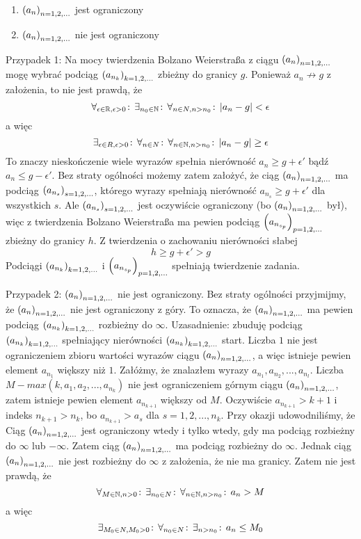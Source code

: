 \documentclass[9pt]{article}
\begin{document}
\begin{enumerate}
    \item $\left(a_n\right)_{n = 1,2,...}$ jest ograniczony
    \item $\left(a_n\right)_{n = 1,2,...}$ nie jest ograniczony
\end{enumerate}

Przypadek 1: Na mocy twierdzenia Bolzano Weierstraßa z ciągu $\left(a_n\right)_{n = 1,2,...}$ mogę wybrać podciąg
$\left(a_{n_k}\right)_{k = 1,2,...}$ zbieżny do granicy $g$. Ponieważ $a_n \not\to g$ z założenia, to nie jest
prawdą, że
\[
    \forall_{\epsilon \in \mathbb{R}, \epsilon > 0} \! : \, \exists_{n_0 \in \mathbb{N}} \! : \, \forall_{n \in N, n > n_0} \! : \, |a_n - g| < \epsilon
\]
a więc
\[
    \exists_{\epsilon \in R, \epsilon > 0} \! : \, \forall_{n \in N} \! : \, \forall_{n \in \mathbb{N}, n > n_0} \! : \, |a_n-g| \ge \epsilon
\]
To znaczy nieskończenie wiele wyrazów spełnia nierówność $a_n \ge g + \epsilon'$ bądź $a_n \le g -
\epsilon'$. Bez straty ogólności możemy zatem założyć, że ciąg $\left(a_n\right)_{n = 1,2,...}$ ma podciąg
$\left(a_{n_s}\right)_{s = 1,2,...}$, którego wyrazy spełniają nierówność $a_{n_s} \ge g + \epsilon'$ dla wszystkich
$s$. Ale $\left(a_{n_s}\right)_{s = 1,2,...}$ jest oczywiście ograniczony (bo $\left(a_n\right)_{n = 1,2,...}$ był), więc z twierdzenia
Bolzano Weierstraßa ma pewien podciąg $\left(a_{n_{s_p}}\right)_{p = 1,2,...}$ zbieżny do granicy $h$. Z twierdzenia
o zachowaniu nierówności słabej
\[
    h \ge g + \epsilon' > g
\]
Podciągi $\left(a_{n_k}\right)_{k = 1,2,...}$ i $\left(a_{n_{s_p}}\right)_{p = 1,2,...}$ spełniają twierdzenie zadania.

Przypadek 2: $\left(a_n\right)_{n = 1,2,...}$ nie jest ograniczony. Bez straty ogólności przyjmijmy, że $\left(a_n\right)_{n = 1,2,...}$ nie
jest ograniczony z góry. To oznacza, że $\left(a_n\right)_{n = 1,2,...}$ ma pewien podciąg $\left(a_{n_k}\right)_{k = 1,2,...}$ rozbieżny
do $\infty$. Uzasadnienie: zbuduję podciąg $\left(a_{n_k}\right)_{k = 1,2,...}$ spełniający nierówności
$\left(a_{n_k}\right)_{k = 1,2,...}$ start. Liczba $1$ nie jest ograniczeniem zbioru wartości wyrazów ciągu
$\left(a_n\right)_{n = 1,2,...}$, a więc istnieje pewien element $a_{n_1}$ większy niż $1$. Załóżmy, że znalazłem wyrazy
$a_{n_1}, a_{n_2}, ..., a_{n_l}$. Liczba $M - max (k, a_1, a_2, ..., a_{n_k})$ nie jest ograniczeniem
górnym ciągu $\left(a_n\right)_{n = 1,2,...}$, zatem istnieje pewien element $a_{n_{k+1}}$ większy od $M$. Oczywiście
$a_{n_{k+1}} > k+1$ i indeks $n_{k+1} > n_k$, bo $a_{n_{k+1}} > a_s$ dla $s = 1,2,...,n_k$. Przy
okazji udowodniliśmy, że Ciąg $\left(a_n\right)_{n = 1,2,...}$ jest ograniczony wtedy i tylko wtedy, gdy ma podciąg
rozbieżny do $\infty$ lub $-\infty$. Zatem ciąg $\left(a_n\right)_{n = 1,2,...}$ ma podciąg rozbieżny do $\infty$. Jednak
ciąg $\left(a_n\right)_{n = 1,2,...}$ nie jest rozbieżny do $\infty$  z założenia, że nie ma granicy. Zatem nie jest
prawdą, że
\[
    \forall_{M \in \mathbb{N}, n > 0} \! : \, \exists_{n_0 \in N} \! : \, \forall_{n \in \mathbb{N}, n > n_0} \! : \, a_n > M
\]
a więc
\[
    \exists_{M_0 \in N, M_0 > 0} \! : \, \forall_{n_0 \in N} \! : \, \exists_{n > n_0} \! : \, a_n \le M_0
\]
\end{document}
